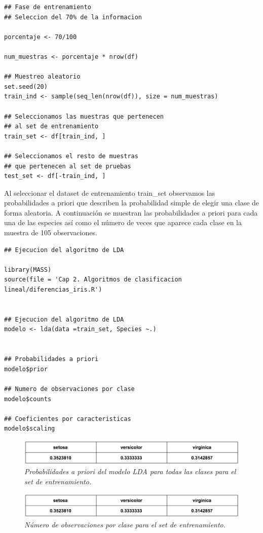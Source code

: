 \documentclass[letterpaper,12pt, spanish, oneside]{book} %
\begin{document}
\begin{lstlisting}
## Fase de entrenamiento
## Seleccion del 70% de la informacion

porcentaje <- 70/100

num_muestras <- porcentaje * nrow(df)

## Muestreo aleatorio
set.seed(20)
train_ind <- sample(seq_len(nrow(df)), size = num_muestras)

## Seleccionamos las muestras que pertenecen
## al set de entrenamiento
train_set <- df[train_ind, ]

## Seleccionamos el resto de muestras
## que pertenecen al set de pruebas
test_set <- df[-train_ind, ]
\end{lstlisting}

Al seleccionar el dataset de entrenamiento train\_set observamos las probabilidades a priori que describen la probabilidad simple de elegir una clase de forma aleatoria. A continuación se muestran las probabilidades a priori para cada una de las especies así como el número de veces que aparece cada clase en la muestra de 105 observaciones.

\begin{lstlisting}
## Ejecucion del algoritmo de LDA

library(MASS)
source(file = 'Cap 2. Algoritmos de clasificacion lineal/diferencias_iris.R')


## Ejecucion del algoritmo de LDA
modelo <- lda(data =train_set, Species ~.)


## Probabilidades a priori
modelo$prior

## Numero de observaciones por clase
modelo$counts

## Coeficientes por caracteristicas
modelo$scaling
\end{lstlisting}

\begin{figure}[H]
\centering
\includegraphics[width=1\textwidth]{fase2.png}
\caption{\label{fig:frog2}\textit{Probabilidades a priori del modelo LDA para todas las clases para el set de entrenamiento.}}
\end{figure}

\begin{figure}[H]
\centering
\includegraphics[width=1\textwidth]{fase2.png}
\caption{\label{fig:frog2}\textit{Número de observaciones por clase para el set de entrenamiento.}}
\end{figure}
\end{document}
